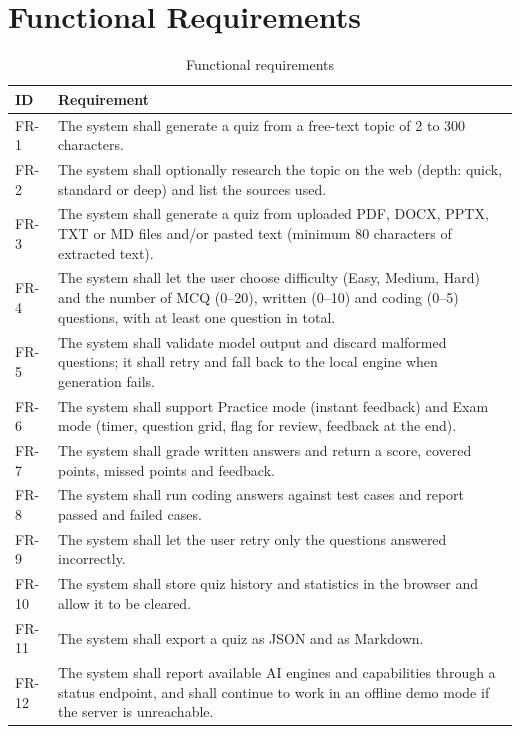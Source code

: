 \section{Functional Requirements}
\begin{table}[H]
\centering
\begin{tabularx}{\textwidth}{@{} p{1.3cm} X @{}}
\toprule
\textbf{ID} & \textbf{Requirement} \\
\midrule
FR-1 & The system shall generate a quiz from a free-text topic of 2 to 300 characters. \\
FR-2 & The system shall optionally research the topic on the web (depth: quick, standard or deep) and list the sources used. \\
FR-3 & The system shall generate a quiz from uploaded PDF, DOCX, PPTX, TXT or MD files and/or pasted text (minimum 80 characters of extracted text). \\
FR-4 & The system shall let the user choose difficulty (Easy, Medium, Hard) and the number of MCQ (0--20), written (0--10) and coding (0--5) questions, with at least one question in total. \\
FR-5 & The system shall validate model output and discard malformed questions; it shall retry and fall back to the local engine when generation fails. \\
FR-6 & The system shall support Practice mode (instant feedback) and Exam mode (timer, question grid, flag for review, feedback at the end). \\
FR-7 & The system shall grade written answers and return a score, covered points, missed points and feedback. \\
FR-8 & The system shall run coding answers against test cases and report passed and failed cases. \\
FR-9 & The system shall let the user retry only the questions answered incorrectly. \\
FR-10 & The system shall store quiz history and statistics in the browser and allow it to be cleared. \\
FR-11 & The system shall export a quiz as JSON and as Markdown. \\
FR-12 & The system shall report available AI engines and capabilities through a status endpoint, and shall continue to work in an offline demo mode if the server is unreachable. \\
\bottomrule
\end{tabularx}
\caption{Functional requirements}
\label{tab:fr}
\end{table}

